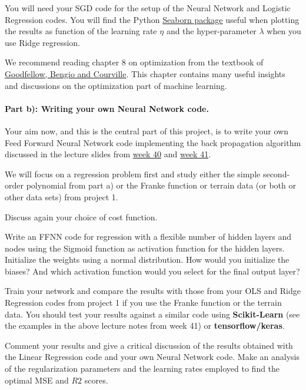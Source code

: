 \documentclass[%
oneside,                 %
final,                   %
10pt]{article}
\begin{document}
You will need your SGD code for the setup of the Neural Network and
Logistic Regression codes. You will find the Python \href{{https://seaborn.pydata.org/generated/seaborn.heatmap.html}}{Seaborn
package}
useful when plotting the results as function of the learning rate
$\eta$ and the hyper-parameter $\lambda$ when you use Ridge
regression.

We recommend reading chapter 8 on optimization from the textbook of \href{{https://www.deeplearningbook.org/}}{Goodfellow, Bengio and Courville}. This chapter contains many useful insights and discussions on the optimization part of machine learning.

\paragraph{Part b): Writing your own Neural Network code.}
Your aim now, and this is the central part of this project, is to
write your own Feed Forward Neural Network  code implementing the back
propagation algorithm discussed in the lecture slides from \href{{https://compphysics.github.io/MachineLearning/doc/pub/week41/html/week40.html}}{week 40} and
\href{{https://compphysics.github.io/MachineLearning/doc/pub/week41/html/week41.html}}{week 41}.

We will focus on a regression problem first and study either the simple second-order polynomial from part a) or the 
Franke function or terrain data (or both or other data sets) from
project 1.

Discuss again your choice of cost function.

Write an FFNN code for regression with a flexible number of hidden
layers and nodes using the Sigmoid function as activation function for
the hidden layers. Initialize the weights using a normal
distribution. How would you initialize the biases? And which
activation function would you select for the final output layer?

Train your network and compare the results with those from your OLS and Ridge Regression codes from project 1 if you use the Franke function or the terrain data.
You should test your results against a similar code using \textbf{Scikit-Learn} (see the examples in the above lecture notes from week 41) or \textbf{tensorflow/keras}. 

Comment your results and give a critical discussion of the results
obtained with the Linear  Regression code and your own Neural Network
code.  
Make an analysis of the regularization parameters and the learning rates employed to find the optimal MSE and $R2$ scores.
\end{document}
